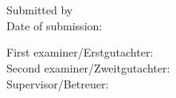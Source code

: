 \thispagestyle{empty}

\noindent\myTitle \\
\noindent\myDegree \\

\bigskip

\noindent Submitted by \myName \\
\noindent Date of submission: \myTime

\bigskip

\noindent  First examiner/Erstgutachter: \myProf \\
\noindent Second examiner/Zweitgutachter: \myOtherProf \\
\noindent Supervisor/Betreuer: \mySupervisor \\

\hfill

\vfill

\noindent \myUni \\
\noindent \myDepartment \\
\noindent \myFaculty \\